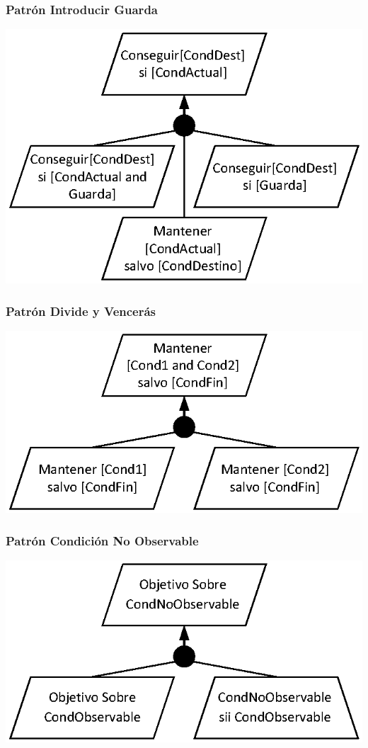 \documentclass[handout,slidestop,xcolor=pst,dvips,blue]{beamer}
\begin{document}
\begin{frame}[c]
    \frametitle{Patrón Introducir Guarda}
    \begin{center}
        \includegraphics[width=0.70\linewidth,keepaspectratio=true]{images/objetivos/guardPattern.eps}
    \end{center}
\end{frame}

\begin{frame}[c]
    \frametitle{Patrón Divide y Vencerás}
    \begin{center}
        \includegraphics[width=0.70\linewidth,keepaspectratio=true]{images/objetivos/divideAndConquerPattern.eps}
    \end{center}
\end{frame}

\begin{frame}[c]
    \frametitle{Patrón Condición No Observable}
    \begin{center}
        \includegraphics[width=0.70\linewidth,keepaspectratio=true]{images/objetivos/unmonitorabilityPattern.eps}
    \end{center}
\end{frame}
\end{document}
